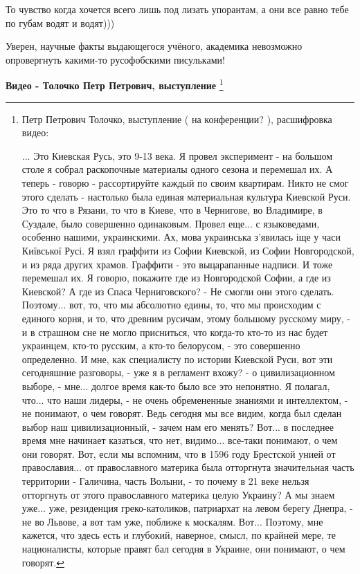 \begin{itemize}
То чувство когда хочется всего лишь под лизать упорантам, а они все равно тебе
по губам водят и водят)))

 
Уверен, научные факты выдающегося учёного, академика невозможно опровергнуть
какими-то русофобскими писульками!

{\bfseries Видео - Толочко Петр Петрович, выступление}
\footnote{
Петр Петрович Толочко, выступление ( на конференции? ), расшифровка видео:

... Это Киевская Русь, это 9-13 века. Я провел эксперимент - на большом столе  
я собрал раскопочные материалы одного сезона и перемешал их. А теперь - говорю - 
рассортируйте каждый по своим квартирам. Никто не смог этого сделать - настолько была единая материальная 
культура Киевской Руси. Это то что в Рязани, то что в Киеве, что в Чернигове, во Владимире, в Суздале, 
было совершенно одинаковым. Провел еще... с языковедами, особенно нашими, украинскими. Ах, мова украинська з'явилась
іще у часи Київської Русі. Я взял граффити из Софии Киевской, из Софии Новгородской, и из ряда других храмов.
Граффити - это выцарапанные надписи. И тоже перемешал их. Я говорю, покажите где из Новгородской Софии, а где из 
Киевской? А где из Спаса Черниговского? - Не смогли они этого сделать. Поэтому... вот, то, что 
мы абсолютно едины, то, что мы происходим с единого корня, и то, что древним русичам, этому большому русскому
миру, - и в страшном сне не могло присниться, что когда-то кто-то из нас будет украинцем, кто-то
русским, а кто-то белорусом, - это совершенно определенно. И мне, как специалисту по истории Киевской Руси,
вот эти сегодняшние разговоры, - уже я в регламент вхожу? - о цивилизационном выборе, - мне...
долгое время как-то было все это непонятно. Я полагал, что... что наши лидеры, - 
не очень обремененные знаниями и интеллектом, - не понимают, о чем говорят. Ведь сегодня мы все видим, когда 
был сделан выбор наш цивилизационный, - зачем нам его менять? Вот... в последнее время мне 
начинает казаться, что нет, видимо... все-таки понимают, о чем они говорят. Вот, если мы вспомним, 
что в 1596 году Брестской унией от православия... от православного материка была отторгнута значительная часть
территории - Галичина, часть Волыни, - то почему в 21 веке нельзя отторгнуть от этого православного материка
целую Украину? А мы знаем уже... уже, резиденция греко-католиков, патриархат на левом берегу Днепра, - не во Львове,
а вот там уже, поближе к москалям. Вот... Поэтому, мне кажется, что здесь есть и глубокий,
наверное, смысл, по крайней мере, те националисты, которые правят бал сегодня в Украине, они понимают,
о чем говорят. 
}


\end{itemize}
